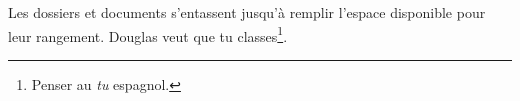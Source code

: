 %
    {Les dossiers et documents s’entassent jusqu’à remplir l’espace disponible pour leur rangement.}%
    {Douglas veut que tu classes\footnote{Penser au \emph{\og tu \fg} espagnol.}.}
